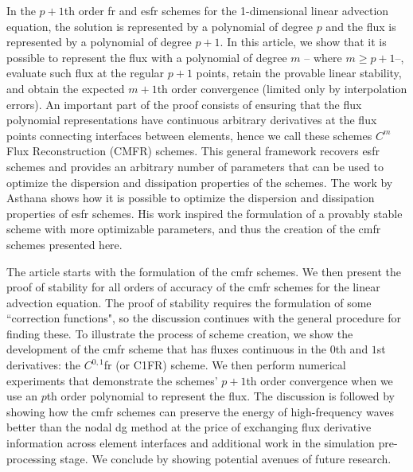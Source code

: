 In the $p+1$th order \gls{fr} and \gls{esfr} schemes for the 1-dimensional linear advection equation, the solution is represented by a polynomial of degree $p$ and the flux is represented by a polynomial of degree $p+1$. In this article, we show that it is possible to represent the flux with a polynomial of degree $m$ -- where $m \ge p+1$--, evaluate such flux at the regular $p+1$ points, retain the provable linear stability, and obtain the expected $m+1$th order convergence (limited only by interpolation errors). An important part of the proof consists of ensuring that the flux polynomial representations have continuous arbitrary derivatives at the flux points connecting interfaces between elements, hence we call these schemes $C^m$ Flux Reconstruction (CMFR) schemes. This general framework recovers \gls{esfr} schemes and provides an arbitrary number of parameters that can be used to optimize the dispersion and dissipation properties of the schemes. The work by Asthana \cite{asthana2014high} shows how it is possible to optimize the dispersion and dissipation properties of \gls{esfr} schemes. His work inspired the formulation of a provably stable scheme with more optimizable parameters, and thus the creation of the \gls{cmfr} schemes presented here.

The article starts with the formulation of the \gls{cmfr} schemes. We then present the proof of stability for all orders of accuracy of the \gls{cmfr} schemes for the linear advection equation. The proof of stability requires the formulation of some ``correction functions", so the discussion continues with the general procedure for finding these. To illustrate the process of scheme creation, we show the development of the \gls{cmfr} scheme that has fluxes continuous in the $0$th and $1$st derivatives: the $C^{0,1}$\gls{fr} (or C1FR) scheme. We then perform numerical experiments that demonstrate the schemes' $p+1$th order convergence when we use an $p$th order polynomial to represent the flux. The discussion is followed by showing how the \gls{cmfr} schemes can preserve the energy of high-frequency waves better than the nodal \gls{dg} method at the price of exchanging flux derivative information across element interfaces and additional work in the simulation pre-processing stage. We conclude by showing potential avenues of future research.